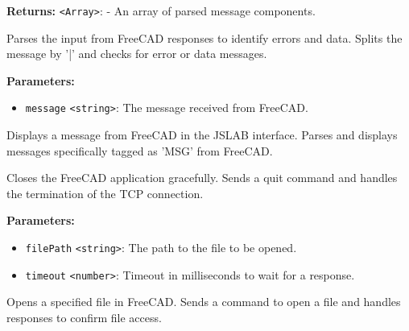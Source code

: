 \documentclass[12pt,a4paper]{article}
\begin{document}
\noindent \textbf{Returns:} \texttt{<Array>}: - An array of parsed message components.

\noindent Parses the input from FreeCAD responses to identify errors and data.
Splits the message by '|' and checks for error or data messages.

\vspace{5mm}
\noindent {}


\noindent \textbf{Parameters:}
\begin{itemize}
  \item \texttt{message} \texttt{<string>}: The message received from FreeCAD.
\end{itemize}

\noindent Displays a message from FreeCAD in the JSLAB interface.
Parses and displays messages specifically tagged as 'MSG' from FreeCAD.

\vspace{5mm}
\noindent {}


\noindent Closes the FreeCAD application gracefully.
Sends a quit command and handles the termination of the TCP connection.

\vspace{5mm}
\noindent {}


\noindent \textbf{Parameters:}
\begin{itemize}
  \item \texttt{filePath} \texttt{<string>}: The path to the file to be opened.
  \item \texttt{timeout} \texttt{<number>}: Timeout in milliseconds to wait for a response.
\end{itemize}

\noindent Opens a specified file in FreeCAD.
Sends a command to open a file and handles responses to confirm file access.

\vspace{5mm}
\noindent {}
\end{document}
